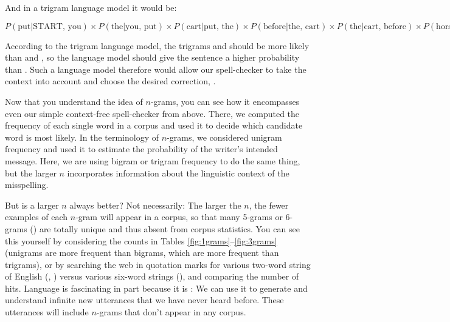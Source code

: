


And in a trigram language model it would be:

\ea  \label{ex:tri-correct} $P(\mbox{put}|\mbox{START, you}) \times
  P(\mbox{the}|\mbox{you, put}) \times P(\mbox{cart}|\mbox{put, the}) \times P(\mbox{before}|\mbox{the, cart}) \times P(\mbox{the}|\mbox{cart, before}) \times P(\mbox{horse}|\mbox{before, the}) \times P(\mbox{END}|\mbox{the, horse})$
  \z 



According to the trigram language model, the trigrams  and  should be more likely than  and , so the language model should give the sentence  a higher probability than .  Such a  language model therefore would allow our spell-checker to take the context into account and choose the desired correction, .

Now that you understand the idea of $n$-grams, you can see how it encompasses even our simple context-free spell-checker from above.  There, we computed the frequency of each single word in a corpus and used it to decide which candidate word is most likely.  In the terminology of $n$-grams, we considered unigram frequency and used it to estimate the probability of the writer's intended message.  Here, we are using bigram or trigram frequency to do the same thing, but the larger $n$ incorporates information about the linguistic context of the misspelling.

\newpage
But is a larger $n$ always better?  Not necessarily: The larger the $n$, the fewer examples of each $n$-gram will appear in a corpus, so that many 5-grams or 6-grams () are totally unique and thus absent from corpus statistics.   
You can see this yourself by considering the counts in Tables \ref{fig:1grams}--\ref{fig:3grams} (unigrams are more frequent than bigrams, which are more frequent than trigrams), or by searching the web in quotation marks for various two-word string of English (, ) versus various six-word strings (), and comparing the number of hits.  Language is fascinating in part because it is : We can use it to generate and understand infinite new utterances that we have never heard before.  These utterances will include $n$-grams that don't appear in any corpus.  



